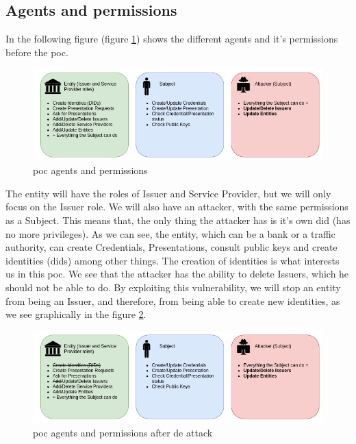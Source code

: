 \documentclass[a4paper, 12pt]{article} %
\begin{document}
    \subsection{Agents and permissions}
        In the following figure (figure \ref{fig:poc-actors}) shows the different agents and it's permissions before the \acrshort{poc}.\\ 
        \begin{figure}[h]
            \centering
            \includegraphics[width=1.0\textwidth]{poc-actors.png}
            \caption{\acrshort{poc} agents and permissions}
            \label{fig:poc-actors}
        \end{figure}
        
        The entity will have the roles of Issuer and Service Provider, but we will only focus on the Issuer role. We will also have an attacker, with the same permissions as a Subject. This means that, the only thing the attacker has is it's own \acrshort{did} (has no more privileges). As we can see, the entity, which can be a bank or a traffic authority, can create Credentials, Presentations, consult public keys and create identities (\acrshort{did}s) among other things. The creation of identities is what interests us in this \acrshort{poc}. We see that the attacker has the ability to delete Issuers, which he should not be able to do. By exploiting this vulnerability, we will stop an entity from being an Issuer, and therefore, from being able to create new identities, as we see graphically in the figure \ref{fig:poc-actors-after}.
        
        \begin{figure}[h]
            \centering
            \includegraphics[width=1.1\textwidth]{poc-actors-after.png}
            \caption{\acrshort{poc} agents and permissions after de attack}
            \label{fig:poc-actors-after}
        \end{figure}
    
\end{document}
